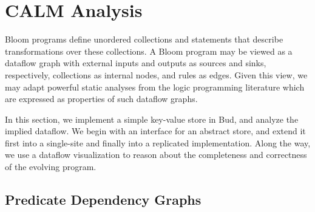 \section{CALM Analysis}
Bloom programs define unordered collections and statements that describe
transformations over these collections.  A Bloom program may be viewed as a
dataflow graph with external inputs and outputs as sources and sinks,
respectively, collections as internal nodes, and rules as edges.  Given this
view, we may adapt powerful static analyses from the logic programming
literature which are expressed as properties of such dataflow graphs.

In this section, we implement a simple key-value store in Bud, and analyze the implied
dataflow.  We begin with an interface for an abstract store, and extend it first into a single-site
and finally into a replicated implementation.  Along the way, we use a dataflow visualization
to reason about the completeness and correctness of the evolving program.

\subsection{Predicate Dependency Graphs}

